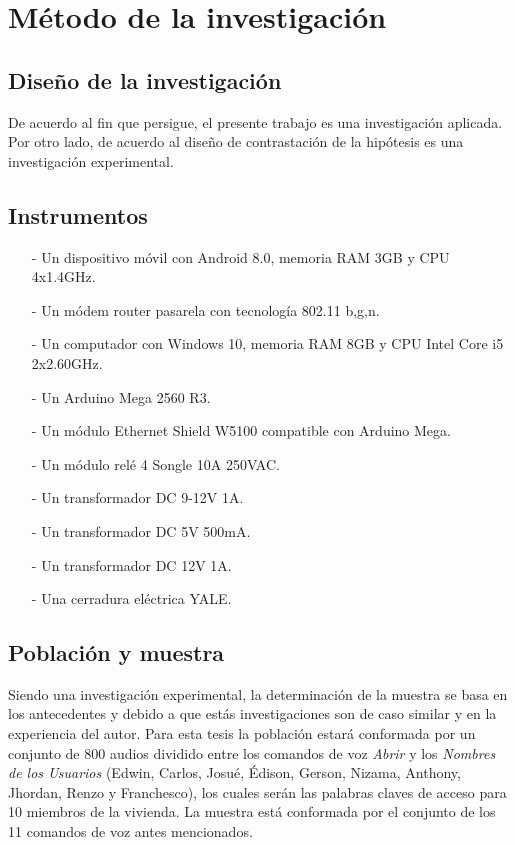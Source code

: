 \section{Método de la investigación}
\subsection{Diseño de la investigación}
De acuerdo al fin que persigue, el presente trabajo es una investigación aplicada. Por otro lado, de acuerdo al diseño de contrastación de la hipótesis es una investigación experimental.

\subsection{Instrumentos}
\begin{enumerate}
\item[-]Un dispositivo móvil con Android 8.0, memoria RAM 3GB y CPU 4x1.4GHz.
\item[-]Un módem router pasarela con tecnología 802.11 b,g,n.
\item[-]Un computador con Windows 10, memoria RAM 8GB y CPU Intel Core i5 2x2.60GHz.
\item[-]Un Arduino Mega 2560 R3.
\item[-]Un módulo Ethernet Shield W5100 compatible con Arduino Mega.
\item[-]Un módulo relé 4 Songle 10A 250VAC.
\item[-]Un transformador DC 9-12V 1A.
\item[-]Un transformador DC 5V 500mA.
\item[-]Un transformador DC 12V 1A.
\item[-]Una cerradura eléctrica YALE.
\end{enumerate}

\subsection{Población y muestra}
Siendo una investigación experimental, la determinación de la muestra se basa en los antecedentes \cite{perez} y \cite{navarrete} debido a que estás investigaciones son de caso similar y en la experiencia del autor.
\vskip 0.5cm
Para esta tesis la población estará conformada por un conjunto de 800 audios dividido entre los comandos de voz \textit{Abrir} y los \textit{Nombres de los Usuarios} (Edwin, Carlos, Josué, Édison, Gerson, Nizama, Anthony, Jhordan, Renzo y Franchesco), los cuales serán las palabras claves de acceso para 10 miembros de la vivienda.
\vskip 0.5cm
La muestra está conformada por el conjunto de los 11 comandos de voz antes mencionados.
\newpage
